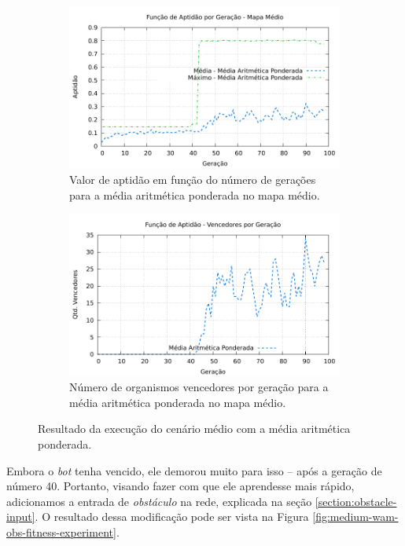 \begin{figure}[H]
\centering
	\begin{subfigure}[b]{0.4\textwidth}
        \includegraphics[width=\textwidth]{fig/medium-wam-fitness-experiment.pdf}
        \caption{Valor de aptidão em função do número de gerações para a média
        aritmética ponderada no mapa médio.}
	\end{subfigure}
	\begin{subfigure}[b]{0.4\textwidth}
        \includegraphics[width=\textwidth]{fig/medium-wam-winners-experiment.pdf}
        \caption{Número de organismos vencedores por geração para a média
        aritmética ponderada no mapa médio.}
	\end{subfigure}

    \caption{Resultado da execução do cenário médio com a média aritmética
    ponderada.}
	\label{fig:medium-wam-experiment}
\end{figure}

Embora o \textit{bot} tenha vencido, ele demorou muito para isso -- após a
geração de número 40. Portanto, visando fazer com que ele aprendesse mais
rápido, adicionamos a entrada de \textit{obstáculo} na rede, explicada na seção
\ref{section:obstacle-input}. O resultado dessa modificação pode ser vista na
Figura \ref{fig:medium-wam-obs-fitness-experiment}.

